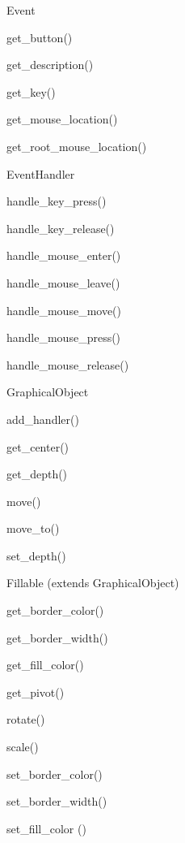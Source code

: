 \begin{DoxyItemize}
\item Event
\begin{DoxyItemize}
\item get\+\_\+button()
\item get\+\_\+description()
\item get\+\_\+key()
\item get\+\_\+mouse\+\_\+location()
\item get\+\_\+root\+\_\+mouse\+\_\+location()
\end{DoxyItemize}
\item Event\+Handler
\begin{DoxyItemize}
\item handle\+\_\+key\+\_\+press()
\item handle\+\_\+key\+\_\+release()
\item handle\+\_\+mouse\+\_\+enter()
\item handle\+\_\+mouse\+\_\+leave()
\item handle\+\_\+mouse\+\_\+move()
\item handle\+\_\+mouse\+\_\+press()
\item handle\+\_\+mouse\+\_\+release()
\end{DoxyItemize}
\item Graphical\+Object
\begin{DoxyItemize}
\item add\+\_\+handler()
\item get\+\_\+center()
\item get\+\_\+depth()
\item move()
\item move\+\_\+to()
\item set\+\_\+depth()
\end{DoxyItemize}
\item Fillable (extends Graphical\+Object)
\begin{DoxyItemize}
\item get\+\_\+border\+\_\+color()
\item get\+\_\+border\+\_\+width()
\item get\+\_\+fill\+\_\+color()
\item get\+\_\+pivot()
\item rotate()
\item scale()
\item set\+\_\+border\+\_\+color()
\item set\+\_\+border\+\_\+width()
\item set\+\_\+fill\+\_\+color ()

\end{DoxyItemize}
\end{DoxyItemize}
